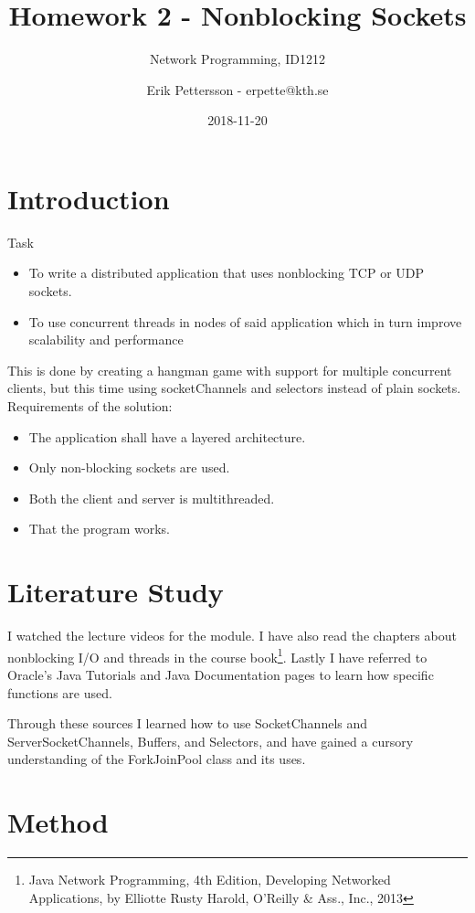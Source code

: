 \documentclass[a4paper]{scrartcl}
\title{Homework 2 - Nonblocking Sockets}
\subtitle{Network Programming, ID1212}
\author{Erik Pettersson - erpette@kth.se}
\date{2018-11-20}
\begin{document}
\maketitle

\section{Introduction}

Task
\begin{itemize}
\item{To write a distributed application that uses nonblocking TCP or UDP sockets.}
\item{To use concurrent threads in nodes of said application which in turn improve scalability and performance}
\end{itemize}

This is done by creating a hangman game with support for multiple concurrent clients, but this time using socketChannels and selectors instead of plain sockets.\\

Requirements of the solution:
\begin{itemize}
\item{The application shall have a layered architecture.}
\item{Only non-blocking sockets are used.}
\item{Both the client and server is multithreaded.}
\item{That the program works.}
\end{itemize}

\section{Literature Study}

I watched the lecture videos for the module. I have also read the chapters about nonblocking I/O and threads in the course book\footnote{Java Network Programming, 4th Edition, Developing Networked Applications, by Elliotte Rusty Harold, O'Reilly \& Ass., Inc., 2013}. Lastly I have referred to Oracle's Java Tutorials and Java Documentation pages to learn how specific functions are used.

Through these sources I learned how to use SocketChannels and ServerSocketChannels, Buffers, and Selectors, and have gained a cursory understanding of the ForkJoinPool class and its uses.

\section{Method}
\end{document}
